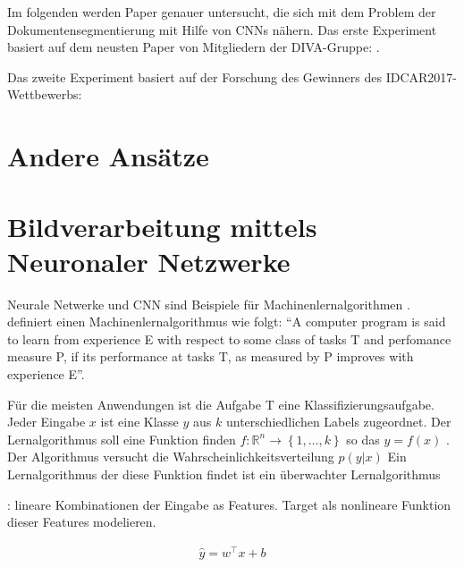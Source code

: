 Im folgenden werden Paper genauer untersucht, die sich mit dem Problem der Dokumentensegmentierung mit Hilfe von CNNs nähern.
Das erste Experiment basiert auf dem neusten Paper von Mitgliedern der DIVA-Gruppe: \citeauthor*{ChenConvolutionalNeuralNetworks2017}. 

Das zweite Experiment basiert auf der Forschung des Gewinners des IDCAR2017-Wettbewerbs: \citeauthor*{XuPageSegmentationHistorical2017} 

\section{Andere Ansätze}
\cite{WickFullyConvolutionalNeural2017}


\section{Bildverarbeitung mittels Neuronaler Netzwerke}
Neurale Netwerke und CNN sind Beispiele für Machinenlernalgorithmen .
\cite{MitchellMachinelearning1997} definiert einen Machinenlernalgorithmus wie folgt: ``A computer program is said to learn from experience E with respect to some class of tasks T and perfomance measure P, if its performance at tasks T, as measured by P improves with experience E''.

Für die meisten Anwendungen ist die Aufgabe T eine Klassifizierungsaufgabe. 
Jeder Eingabe \(x\) ist eine Klasse \(y\) aus \(k\) unterschiedlichen Labels zugeordnet. 
Der Lernalgorithmus soll eine Funktion finden \(f: \mathds{R}^n \rightarrow \left\{1,\dots,k \right\} \) so das \(y = f\left(x\right)\) \parencite[97 ff]{GoodfellowDeeplearning2016}.
Der Algorithmus versucht die Wahrscheinlichkeitsverteilung \(p(y | x)\)
Ein Lernalgorithmus der diese Funktion findet ist ein überwachter Lernalgorithmus 

\cite[393]{Hastieelementsstatisticallearning2009}: lineare Kombinationen der Eingabe as Features. Target als nonlineare Funktion dieser Features modelieren.  

\begin{align}
    \hat { y } = w^{ \top } x + b
\end{align}

